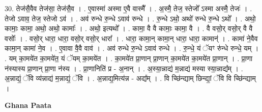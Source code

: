 \documentclass[17pt]{extarticle}
\begin{document}
30. तेज॑सै॒वैव तेज॑सा॒ तेज॑सै॒व । . ए॒वास्मा॑ अस्मा ए॒वै वास्मै᳚ । . अ॒स्मै॒ तेज॒ स्तेजो᳚ ऽस्मा अस्मै॒ तेजः॑ । . तेजो ऽवाव॒ तेज॒ स्तेजो ऽव॑ । . अव॑ रुन्धे रु॒न्धे ऽवाव॑ रुन्धे । . रु॒न्धे ऽथो॒ अथो॑ रुन्धे रु॒न्धे ऽथो᳚ । . अथो॒ कामाः॒ कामा॒ अथो॒ अथो॒ कामाः᳚ । . अथो॒ इत्यथो᳚ । . कामा॒ वै वै कामाः॒ कामा॒ वै । . वै वसो॒र् वसो॒र् वै वै वसोः᳚ । . वसो॒र् धारा॒ धारा॒ वसो॒र् वसो॒र् धारा᳚ । . धारा॒ कामा॒न् कामा॒न् धारा॒ धारा॒ कामान्॑ । . कामा॑ ने॒वैव कामा॒न् कामा॑ ने॒व । . ए॒वावा वै॒वै वाव॑ । . अव॑ रुन्धे रु॒न्धे ऽवाव॑ रुन्धे । . रु॒न्धे॒ यं ॅयꣳ रु॑न्धे रुन्धे॒ यम् । . यम् का॒मये॑त का॒मये॑त॒ यं ॅयम् का॒मये॑त । . का॒मये॑त प्रा॒णान् प्रा॒णान् का॒मये॑त का॒मये॑त प्रा॒णान् । . प्रा॒णा न॑स्यास्य प्रा॒णान् प्रा॒णा न॑स्य । . प्रा॒णानिति॑ प्र - अ॒नान् । . अ॒स्या॒न्नाद्य॑ म॒न्नाद्य॑ मस्या स्या॒न्नाद्य᳚म् । . अ॒न्नाद्यं॒ ॅवि व्य॑न्नाद्य॑ म॒न्नाद्यं॒ ॅवि । . अ॒न्नाद्य॒मित्य॑न्न - अद्य᳚म् । . वि च्छि॑न्द्याम् छिन्द्यां॒ ॅवि वि च्छि॑न्द्याम् । \newline

\textbf{Ghana Paata } \newline
\end{document}
